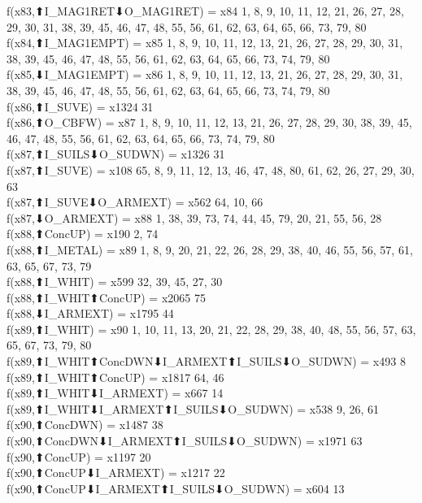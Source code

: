 f(x83,⬆I_MAG1RET⬇O_MAG1RET) = x84 {1, 8, 9, 10, 11, 12, 21, 26, 27, 28, 29, 30, 31, 38, 39, 45, 46, 47, 48, 55, 56, 61, 62, 63, 64, 65, 66, 73, 79, 80} \\
f(x84,⬆I_MAG1EMPT) = x85 {1, 8, 9, 10, 11, 12, 13, 21, 26, 27, 28, 29, 30, 31, 38, 39, 45, 46, 47, 48, 55, 56, 61, 62, 63, 64, 65, 66, 73, 74, 79, 80} \\
f(x85,⬇I_MAG1EMPT) = x86 {1, 8, 9, 10, 11, 12, 13, 21, 26, 27, 28, 29, 30, 31, 38, 39, 45, 46, 47, 48, 55, 56, 61, 62, 63, 64, 65, 66, 73, 74, 79, 80} \\
f(x86,⬆I_SUVE) = x1324 {31} \\
f(x86,⬆O_CBFW) = x87 {1, 8, 9, 10, 11, 12, 13, 21, 26, 27, 28, 29, 30, 38, 39, 45, 46, 47, 48, 55, 56, 61, 62, 63, 64, 65, 66, 73, 74, 79, 80} \\
f(x87,⬆I_SUILS⬇O_SUDWN) = x1326 {31} \\
f(x87,⬆I_SUVE) = x108 {65, 8, 9, 11, 12, 13, 46, 47, 48, 80, 61, 62, 26, 27, 29, 30, 63} \\
f(x87,⬆I_SUVE⬇O_ARMEXT) = x562 {64, 10, 66} \\
f(x87,⬇O_ARMEXT) = x88 {1, 38, 39, 73, 74, 44, 45, 79, 20, 21, 55, 56, 28} \\
f(x88,⬆ConcUP) = x190 {2, 74} \\
f(x88,⬆I_METAL) = x89 {1, 8, 9, 20, 21, 22, 26, 28, 29, 38, 40, 46, 55, 56, 57, 61, 63, 65, 67, 73, 79} \\
f(x88,⬆I_WHIT) = x599 {32, 39, 45, 27, 30} \\
f(x88,⬆I_WHIT⬆ConcUP) = x2065 {75} \\
f(x88,⬇I_ARMEXT) = x1795 {44} \\
f(x89,⬆I_WHIT) = x90 {1, 10, 11, 13, 20, 21, 22, 28, 29, 38, 40, 48, 55, 56, 57, 63, 65, 67, 73, 79, 80} \\
f(x89,⬆I_WHIT⬆ConcDWN⬇I_ARMEXT⬆I_SUILS⬇O_SUDWN) = x493 {8} \\
f(x89,⬆I_WHIT⬆ConcUP) = x1817 {64, 46} \\
f(x89,⬆I_WHIT⬇I_ARMEXT) = x667 {14} \\
f(x89,⬆I_WHIT⬇I_ARMEXT⬆I_SUILS⬇O_SUDWN) = x538 {9, 26, 61} \\
f(x90,⬆ConcDWN) = x1487 {38} \\
f(x90,⬆ConcDWN⬇I_ARMEXT⬆I_SUILS⬇O_SUDWN) = x1971 {63} \\
f(x90,⬆ConcUP) = x1197 {20} \\
f(x90,⬆ConcUP⬇I_ARMEXT) = x1217 {22} \\
f(x90,⬆ConcUP⬇I_ARMEXT⬆I_SUILS⬇O_SUDWN) = x604 {13} \\
